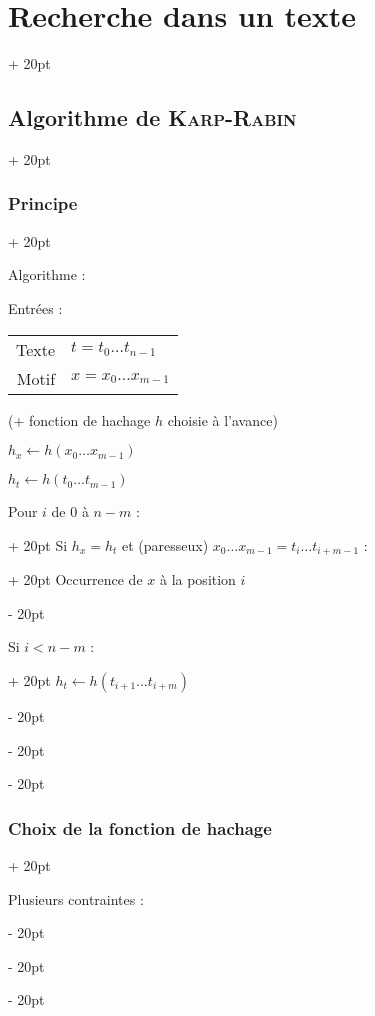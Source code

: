 \documentclass[a4paper, 12pt, twoside]{article}
\newcommand{\ind}[1][20pt]{\advance\leftskip + #1}
\newcommand{\deind}[1][20pt]{\advance\leftskip - #1}
\newenvironment{indt}[2][20pt]{#2 \par \ind[#1]}{\par \deind} %
\begin{document}
\begin{indt}{\section{Recherche dans un texte}}
\begin{indt}{\subsection{Algorithme de \textsc{Karp-Rabin}}}
\begin{indt}{\subsubsection{Principe}}
                \vspace{12pt}
                
                Algorithme :

                Entrées :
                \begin{tabular}{r|l}
                    Texte & $t = t_0 \ldots t_{n - 1}$
                    \\
                    Motif & $x = x_0 \ldots x_{m - 1}$
                \end{tabular}
                (+ fonction de hachage $h$ choisie à l'avance)

                \begin{pseudocode}
                    $h_x \leftarrow h(x_0 \ldots x_{m - 1})$

                    $h_t \leftarrow h(t_0 \ldots t_{m - 1})$

                    \vspace{6pt}
                    
                    \begin{indt}{Pour $i$ de 0 à $n - m$ :}
                        \begin{indt}{Si $h_x = h_t$ et (paresseux) $x_0 \ldots x_{m - 1} = t_i \ldots t_{i + m - 1}$ :}
                            Occurrence de $x$ à la position $i$
                        \end{indt}

                        \vspace{6pt}
                        
                        \begin{indt}{Si $i < n - m$ :}
                            $h_t \leftarrow h(t_{i + 1} \ldots t_{i + m})$
                        \end{indt}
                    \end{indt}
                \end{pseudocode}
            \end{indt}

            \vspace{12pt}
            
            \begin{indt}{\subsubsection{Choix de la fonction de hachage}}
            
                Plusieurs contraintes :


\end{indt}
\end{indt}
\end{indt}
\end{document}
